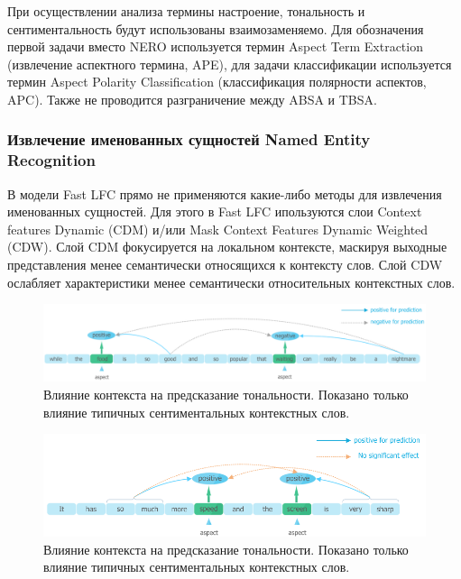 При осуществлении анализа  термины \flqq настроение\frqq, \flqq тональность\frqq \vspace{1pt} и \flqq сентиментальность\frqq \vspace{1pt} будут использованы взаимозаменяемо. Для обозначения первой задачи вместо NERO используется термин Aspect Term Extraction (извлечение аспектного термина, APE), для задачи классификации используется термин Aspect Polarity Classification (классификация полярности аспектов, APC). Также не проводится разграничение между ABSA и TBSA.

\subsubsection{Извлечение именованных сущностей Named Entity Recognition}

В модели Fast LFC прямо не применяются какие-либо методы для извлечения именованных сущностей. Для этого в Fast LFC ипользуются слои Context features Dynamic (CDM) и/или Mask Context Features Dynamic Weighted (CDW). Слой CDM фокусируется на локальном контексте, маскируя выходные представления менее семантически относящихся к контексту слов. Слой CDW ослабляет характеристики менее семантически относительных контекстных слов.


\begin{figure}[htbp]
    \centering
    \includegraphics[width=1\linewidth]{images/Different influence of context words on sentiment polarity prediction.png}
    \caption{Влияние контекста на предсказание тональности. Показано только влияние типичных сентиментальных контекстных слов. \cite{Zeng2019LCFAL}}
    \label{fig:context-words-1}
\end{figure}

\vspace{3mm}

\begin{figure}[htbp]
    \centering
    \includegraphics[width=1\linewidth]{images/Different influence of context words on sentiment polarity prediction2.png}
    \caption{Влияние контекста на предсказание тональности. Показано только влияние типичных сентиментальных контекстных слов. \cite{Zeng2019LCFAL}}
    \label{fig:context-words-2}
\end{figure}

